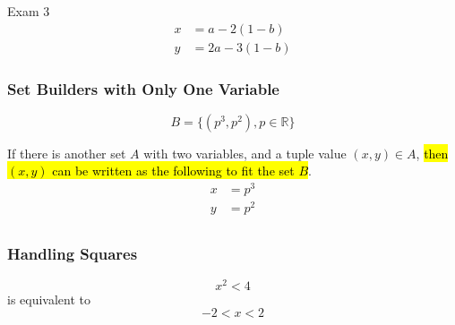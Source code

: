 \documentclass{note}
\begin{document}
\begin{note}{Exam 3}
        \begin{align*}
            x &= a - 2(1 - b) \\
            y &= 2a - 3 (1 - b)
        \end{align*}

        \subsubsection{Set Builders with Only One Variable}

        \begin{displaymath}
            B = \{ \left(p^{3}, p^{2} \right), p \in \mathbb{R} \}
        \end{displaymath}

        If there is another set $ A $ with two variables, and a tuple value $ (x,y) \in A $, \hl{then $ (x,y) $ can
        be written as the following to fit the set $ B $}.
        \begin{align*}
            x &= p^{3} \\
            y &= p^{2} \\
        \end{align*}

        \subsubsection{Handling Squares}

        \begin{displaymath}
            x^{2} < 4
        \end{displaymath}
        is equivalent to
        \begin{displaymath}
            -2 < x < 2
        \end{displaymath}

    \end{note}
\end{document}

